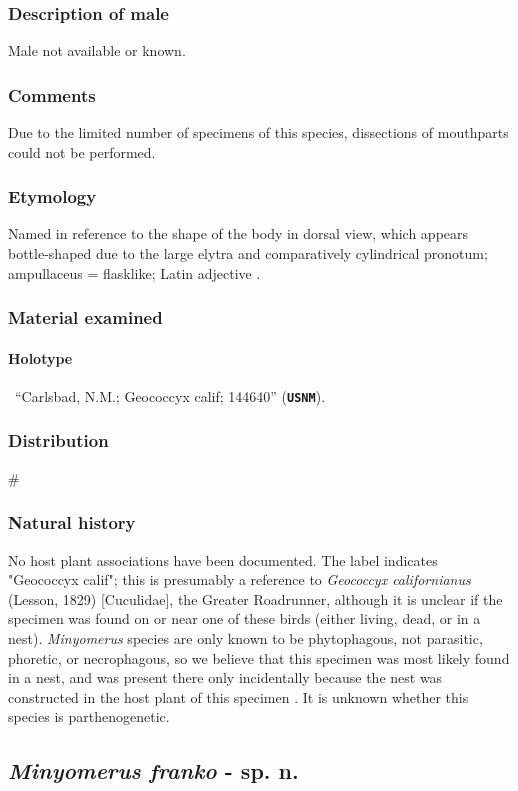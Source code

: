 \documentclass[fleqn,10pt,lineno]{wlpeerj} %
\begin{document}
		\subsubsection*{Description of male}
			Male not available or known.
		\subsubsection*{Comments}
			Due to the limited number of specimens of this species, dissections of mouthparts could not be performed.
		\subsubsection*{Etymology}
			Named in reference to the shape of the body in dorsal view, which appears bottle-shaped due to the large elytra and comparatively cylindrical pronotum; ampullaceus = flasklike; Latin adjective \citep{brown1956}.
		\subsubsection*{Material examined}
			\paragraph{Holotype}
				\female~``Carlsbad, N.M.; Geococcyx calif; 144640'' (\texttt{\textbf{USNM}}).
		\subsubsection*{Distribution}
			\#
		\subsubsection*{Natural history}
			No host plant associations have been documented.
			The label indicates "Geococcyx calif"; this is presumably a reference to \textit{Geococcyx californianus} (Lesson, 1829) [Cuculidae], the Greater Roadrunner, although it is unclear if the specimen was found on or near one of these birds (either living, dead, or in a nest).
			\textit{Minyomerus} species are only known to be phytophagous, not parasitic, phoretic, or necrophagous, so we believe that this specimen was most likely found in a nest, and was present there only incidentally because the nest was constructed in the host plant of this specimen \citep{jansen2015}.
			It is unknown whether this species is parthenogenetic.
			
	\subsection*{\textit{Minyomerus franko} - sp. n.}
\end{document}
